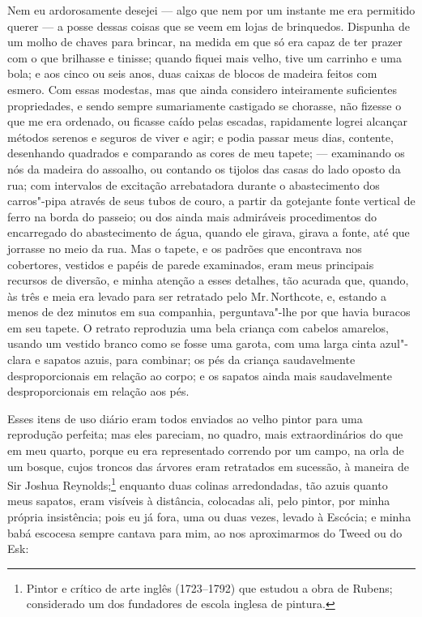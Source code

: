 Nem eu ardorosamente desejei --- algo que nem por um instante me era
permitido querer --- a posse dessas coisas que se veem em lojas de
brinquedos. Dispunha de um molho de chaves para brincar, na medida em
que só era capaz de ter prazer com o que brilhasse e tinisse; quando
fiquei mais velho, tive um carrinho e uma bola; e aos cinco ou seis
anos, duas caixas de blocos de madeira feitos com esmero. Com essas
modestas, mas que ainda considero inteiramente suficientes propriedades,
e sendo sempre sumariamente castigado se chorasse, não fizesse o que me
era ordenado, ou ficasse caído pelas escadas, rapidamente logrei
alcançar métodos serenos e seguros de viver e agir; e podia passar meus
dias, contente, desenhando quadrados e comparando as cores de meu
tapete; --- examinando os nós da madeira do assoalho, ou contando os
tijolos das casas do lado oposto da rua; com intervalos de excitação
arrebatadora durante o abastecimento dos carros"-pipa através de seus
tubos de couro, a partir da gotejante fonte vertical de ferro na borda
do passeio; ou dos ainda mais admiráveis procedimentos do encarregado do
abastecimento de água, quando ele girava, girava a fonte, até que
jorrasse no meio da rua. Mas o tapete, e os padrões que encontrava nos
cobertores, vestidos e papéis de parede examinados, eram meus principais
recursos de diversão, e minha atenção a esses detalhes, tão acurada que,
quando, às três e meia era levado para ser retratado pelo Mr.\,Northcote,
e, estando a menos de dez minutos em sua companhia, perguntava"-lhe
por que havia buracos em seu tapete. O retrato reproduzia uma bela
criança com cabelos amarelos, usando um vestido branco como se fosse uma
garota, com uma larga cinta azul"-clara e sapatos azuis, para combinar;
os pés da criança saudavelmente desproporcionais em relação ao corpo; e
os sapatos ainda mais saudavelmente desproporcionais em relação aos pés.

Esses itens de uso diário eram todos enviados ao velho pintor para
uma reprodução perfeita; mas eles pareciam, no quadro, mais
extraordinários do que em meu quarto, porque eu era representado
correndo por um campo, na orla de um bosque, cujos troncos das árvores
eram retratados em sucessão, à maneira de Sir Joshua Reynolds;\footnote{Pintor
  e crítico de arte inglês (1723--1792) que estudou a obra de Rubens;
  considerado um dos fundadores de escola inglesa de pintura.} enquanto duas colinas arredondadas, tão azuis quanto meus
sapatos, eram visíveis à distância, colocadas ali, pelo pintor, por
minha própria insistência; pois eu já fora, uma ou duas vezes, levado à
Escócia; e minha babá escocesa sempre cantava para mim, ao nos
aproximarmos do Tweed ou do Esk:
\bigskip

